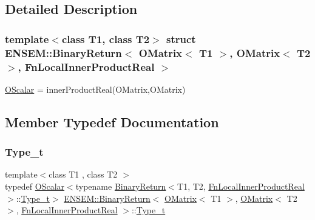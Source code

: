 \subsection{Detailed Description}
\subsubsection*{template$<$class T1, class T2$>$\newline
struct E\+N\+S\+E\+M\+::\+Binary\+Return$<$ O\+Matrix$<$ T1 $>$, O\+Matrix$<$ T2 $>$, Fn\+Local\+Inner\+Product\+Real $>$}

\mbox{\hyperlink{classENSEM_1_1OScalar}{O\+Scalar}} = inner\+Product\+Real(\+O\+Matrix,\+O\+Matrix) 

\subsection{Member Typedef Documentation}
\mbox{\label{structENSEM_1_1BinaryReturn_3_01OMatrix_3_01T1_01_4_00_01OMatrix_3_01T2_01_4_00_01FnLocalInnerProductReal_01_4_a64139d0b3cc92c79f958c772a7c70bad}} 
\subsubsection{\texorpdfstring{Type\_t}{Type\_t}\hspace{0.1cm}{\footnotesize\ttfamily [1/2]}}
{\footnotesize\ttfamily template$<$class T1 , class T2 $>$ \\
typedef \mbox{\hyperlink{classENSEM_1_1OScalar}{O\+Scalar}}$<$typename \mbox{\hyperlink{structENSEM_1_1BinaryReturn}{Binary\+Return}}$<$T1, T2, \mbox{\hyperlink{structENSEM_1_1FnLocalInnerProductReal}{Fn\+Local\+Inner\+Product\+Real}}$>$\+::\mbox{\hyperlink{structENSEM_1_1BinaryReturn_3_01OMatrix_3_01T1_01_4_00_01OMatrix_3_01T2_01_4_00_01FnLocalInnerProductReal_01_4_a64139d0b3cc92c79f958c772a7c70bad}{Type\+\_\+t}}$>$ \mbox{\hyperlink{structENSEM_1_1BinaryReturn}{E\+N\+S\+E\+M\+::\+Binary\+Return}}$<$ \mbox{\hyperlink{classENSEM_1_1OMatrix}{O\+Matrix}}$<$ T1 $>$, \mbox{\hyperlink{classENSEM_1_1OMatrix}{O\+Matrix}}$<$ T2 $>$, \mbox{\hyperlink{structENSEM_1_1FnLocalInnerProductReal}{Fn\+Local\+Inner\+Product\+Real}} $>$\+::\mbox{\hyperlink{structENSEM_1_1BinaryReturn_3_01OMatrix_3_01T1_01_4_00_01OMatrix_3_01T2_01_4_00_01FnLocalInnerProductReal_01_4_a64139d0b3cc92c79f958c772a7c70bad}{Type\+\_\+t}}}

